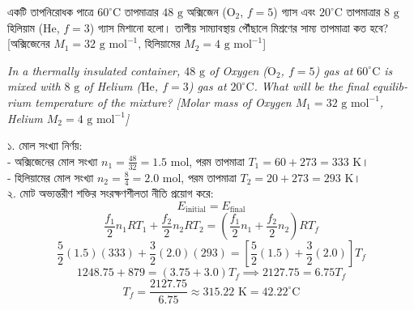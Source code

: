 \documentclass[12pt, a4paper]{article}
\begin{document}
\begin{tcolorbox}[questionbox={প্রশ্ন (Question) 3}]
\noindent
একটি তাপনিরোধক পাত্রে $60^\circ\text{C}$ তাপমাত্রার $48\text{ g}$ অক্সিজেন ($\text{O}_2$, $f=5$) গ্যাস এবং $20^\circ\text{C}$ তাপমাত্রার $8\text{ g}$ হিলিয়াম ($\text{He}$, $f=3$) গ্যাস মিশানো হলো। তাপীয় সাম্যাবস্থায় পৌঁছালে মিশ্রণের সাম্য তাপমাত্রা কত হবে? [অক্সিজেনের $M_1 = 32\text{ g mol}^{-1}$, হিলিয়ামের $M_2 = 4\text{ g mol}^{-1}$]

\vspace{0.8em}
\begin{english}
\noindent\textit{\color{darkgray}
In a thermally insulated container, $48\text{ g}$ of Oxygen ($\text{O}_2$, $f=5$) gas at $60^\circ\text{C}$ is mixed with $8\text{ g}$ of Helium ($\text{He}$, $f=3$) gas at $20^\circ\text{C}$. What will be the final equilibrium temperature of the mixture? [Molar mass of Oxygen $M_1 = 32\text{ g mol}^{-1}$, Helium $M_2 = 4\text{ g mol}^{-1}$]
}
\end{english}
\end{tcolorbox}

\vspace{1em}

\begin{tcolorbox}[solutionbox={সমাধান (Solution)}]
\noindent
১. মোল সংখ্যা নির্ণয়: \\
- অক্সিজেনের মোল সংখ্যা $n_1 = \frac{48}{32} = 1.5\text{ mol}$, পরম তাপমাত্রা $T_1 = 60 + 273 = 333\text{ K}$। \\
- হিলিয়ামের মোল সংখ্যা $n_2 = \frac{8}{4} = 2.0\text{ mol}$, পরম তাপমাত্রা $T_2 = 20 + 273 = 293\text{ K}$। \\
২. মোট অভ্যন্তরীণ শক্তির সংরক্ষণশীলতা নীতি প্রয়োগ করে:
\[ E_{\text{initial}} = E_{\text{final}} \]
\[ \frac{f_1}{2} n_1 R T_1 + \frac{f_2}{2} n_2 R T_2 = \left(\frac{f_1}{2} n_1 + \frac{f_2}{2} n_2\right) R T_f \]
\[ \frac{5}{2}(1.5)(333) + \frac{3}{2}(2.0)(293) = \left[\frac{5}{2}(1.5) + \frac{3}{2}(2.0)\right] T_f \]
\[ 1248.75 + 879 = (3.75 + 3.0) T_f \implies 2127.75 = 6.75 T_f \]
\[ T_f = \frac{2127.75}{6.75} \approx 315.22\text{ K} = 42.22^\circ\text{C} \]
\end{tcolorbox}

\vspace{1.5em}
\end{document}
